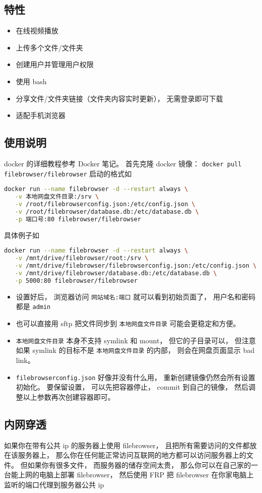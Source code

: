 
\begin{issues}
\issueDraft
\end{issues}

\subsection{特性}
\begin{itemize}
\item 在线视频播放
\item 上传多个文件/文件夹
\item 创建用户并管理用户权限
\item 使用 bash
\item 分享文件/文件夹链接（文件夹内容实时更新）， 无需登录即可下载
\item 适配手机浏览器
\end{itemize}

\subsection{使用说明}
docker 的详细教程参考 Docker 笔记。 首先克隆 docker 镜像： \verb|docker pull filebrowser/filebrowser|
启动的格式如
\begin{lstlisting}[language=bash]
docker run --name filebrowser -d --restart always \
   -v 本地网盘文件目录:/srv \
   -v /root/filebrowserconfig.json:/etc/config.json \
   -v /root/filebrowser/database.db:/etc/database.db \
   -p 端口号:80 filebrowser/filebrowser
\end{lstlisting}
具体例子如 %
\begin{lstlisting}[language=bash]
docker run --name filebrowser -d --restart always \
   -v /mnt/drive/filebrowser/root:/srv \
   -v /mnt/drive/filebrowser/filebrowserconfig.json:/etc/config.json \
   -v /mnt/drive/filebrowser/database.db:/etc/database.db \
   -p 5000:80 filebrowser/filebrowser
\end{lstlisting}

\begin{itemize}
\item 设置好后， 浏览器访问 \verb`网站域名:端口` 就可以看到初始页面了， 用户名和密码都是 \verb`admin`
\item 也可以直接用 sftp 把文件同步到 \verb`本地网盘文件目录` 可能会更稳定和方便。
\item \verb`本地网盘文件目录` 本身不支持 symlink 和 mount， 但它的子目录可以， 但注意如果 symlink 的目标不是 \verb|本地网盘文件目录| 的内部， 则会在网盘页面显示 bad link。
\item \verb|filebrowserconfig.json| 好像并没有什么用， 重新创建镜像仍然会所有设置初始化。 要保留设置， 可以先把容器停止， commit 到自己的镜像， 然后调整以上参数再次创建容器即可。
\end{itemize}

\subsection{内网穿透}

如果你在带有公共 ip 的服务器上使用 filebrowser， 且把所有需要访问的文件都放在该服务器上， 那么你在任何能正常访问互联网的地方都可以访问服务器上的文件。 但如果你有很多文件， 而服务器的储存空间太贵， 那么你可以在自己家的一台能上网的电脑上部署 filebrowser， 然后使用 FRP 把 filebrowser 在你家电脑上监听的端口代理到服务器公共 ip
